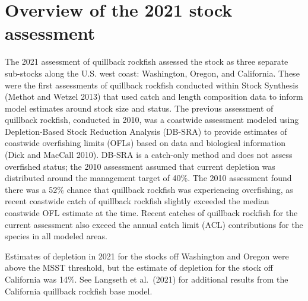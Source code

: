 \documentclass[11pt,
  english,
  letterpaper,
]{article}
\begin{document}
\leavevmode\tagmcend\tagstructend\par


\hypertarget{overview-of-the-2021-stock-assessment}{%
\section{Overview of the 2021 stock assessment}\label{overview-of-the-2021-stock-assessment}}

\leavevmode\tagmcend\tagstructend


The 2021 assessment of quillback rockfish assessed the stock as three separate sub-stocks along the U.S. west coast: Washington, Oregon, and California. These were the first assessments of quillback rockfish conducted within Stock Synthesis {(Methot and Wetzel 2013)\leavevmode\tagmcend\tagstructend} that used catch and length composition data to inform model estimates around stock size and status. The previous assessment of quillback rockfish, conducted in 2010, was a coastwide assessment modeled using Depletion-Based Stock Reduction Analysis (DB-SRA) to provide estimates of coastwide overfishing limits (OFLs) based on data and biological information {(Dick and MacCall 2010)\leavevmode\tagmcend\tagstructend}. DB-SRA is a catch-only method and does not assess overfished status; the 2010 assessment assumed that current depletion was distributed around the management target of 40\%. The 2010 assessment found there was a 52\% chance that quillback rockfish was experiencing overfishing, as recent coastwide catch of quillback rockfish slightly exceeded the median coastwide OFL estimate at the time. Recent catches of quillback rockfish for the current assessment also exceed the annual catch limit (ACL) contributions for the species in all modeled areas.

\leavevmode\tagmcend\tagstructend\par


Estimates of depletion in 2021 for the stocks off Washington and Oregon were above the MSST threshold, but the estimate of depletion for the stock off California was 14\%. See Langseth et al.~{(2021)\leavevmode\tagmcend\tagstructend} for additional results from the California quillback rockfish base model.
\end{document}
